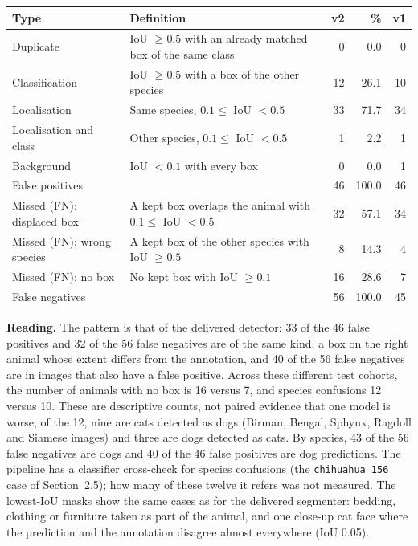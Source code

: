 \documentclass[11pt,a4paper]{article}
\begin{document}
\begin{tabularx}{\linewidth}{@{}l Y r r r@{}}
\toprule
Type & Definition & v2 & \% & v1 \\
\midrule
Duplicate & IoU $\geq0.5$ with an already matched box of the same class & 0 & 0.0 & 0 \\
Classification & IoU $\geq0.5$ with a box of the other species & 12 & 26.1 & 10 \\
Localisation & Same species, $0.1\leq$ IoU $<0.5$ & 33 & 71.7 & 34 \\
Localisation and class & Other species, $0.1\leq$ IoU $<0.5$ & 1 & 2.2 & 1 \\
Background & IoU $<0.1$ with every box & 0 & 0.0 & 1 \\
\midrule
False positives & & 46 & 100.0 & 46 \\
\midrule
Missed (FN): displaced box & A kept box overlaps the animal with $0.1\leq$ IoU $<0.5$ & 32 & 57.1 & 34 \\
Missed (FN): wrong species & A kept box of the other species with IoU $\geq0.5$ & 8 & 14.3 & 4 \\
Missed (FN): no box & No kept box with IoU $\geq0.1$ & 16 & 28.6 & 7 \\
\midrule
False negatives & & 56 & 100.0 & 45 \\
\bottomrule
\end{tabularx}

\textbf{Reading.} The pattern is that of the delivered detector: 33 of the 46 false positives and 32 of the 56 false negatives are of the same kind, a box on the right animal whose extent differs from the annotation, and 40 of the 56 false negatives are in images that also have a false positive. Across these different test cohorts, the number of animals with no box is 16 versus 7, and species confusions 12 versus 10. These are descriptive counts, not paired evidence that one model is worse;  of the 12, nine are cats detected as dogs (Birman, Bengal, Sphynx, Ragdoll and Siamese images) and three are dogs detected as cats. By species, 43 of the 56 false negatives are dogs and 40 of the 46 false positives are dog predictions. The pipeline has a classifier cross-check for species confusions (the \texttt{chihuahua\_156} case of Section~2.5); how many of these twelve it refers was not measured. The lowest-IoU masks show the same cases as for the delivered segmenter: bedding, clothing or furniture taken as part of the animal, and one close-up cat face where the prediction and the annotation disagree almost everywhere (IoU 0.05).
\end{document}
